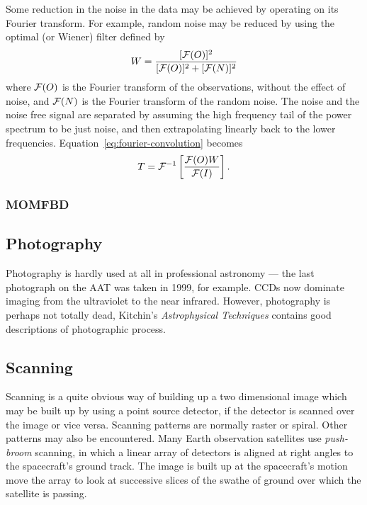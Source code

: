 \documentclass{article}
\def\cl#1{{\cal #1}}               %
\begin{document}
Some reduction in the noise in the data may be achieved by operating on its Fourier transform. For example, random noise may be reduced by using the optimal (or Wiener) filter defined by 
\[
W={[\cl{F}(O)]^2\over[\cl{F}(O)]^2+[\cl{F}(N)]^2}
\]
where $\cl{F}(O)$ is the Fourier transform of the observations, without the effect of noise, and $\cl{F}(N)$ is the Fourier transform of the random noise. The noise and the noise free signal are separated by assuming the high frequency tail of the power spectrum to be just noise, and then extrapolating linearly back to the lower frequencies. Equation~\ref{eq:fourier-convolution} becomes
\[
T=\cl{F}^{-1}\left[{\cl{F}(O)W\over\cl{F}(I)}\right].
\]
\subsubsection{MOMFBD}

\subsection{Photography}
Photography is hardly used at all in professional astronomy --- the last photograph on the AAT was taken in 1999, for example. CCDs now dominate imaging from the ultraviolet to the near infrared. However, photography is perhaps not totally dead, Kitchin's {\it Astrophysical Techniques} contains good descriptions of photographic process.

\subsection{Scanning}

Scanning is a quite obvious way of building up a two dimensional image which may be built up by using a point source detector, if the detector is scanned over the image or vice versa. Scanning patterns are normally raster or spiral. Other patterns may also be encountered. Many Earth observation satellites use {\it push-broom} scanning, in which a linear array of detectors is aligned at right angles to the spacecraft's ground track. The image is built up at the spacecraft's motion move the array to look at successive slices of the swathe of ground over which the satellite is passing.
\end{document}
